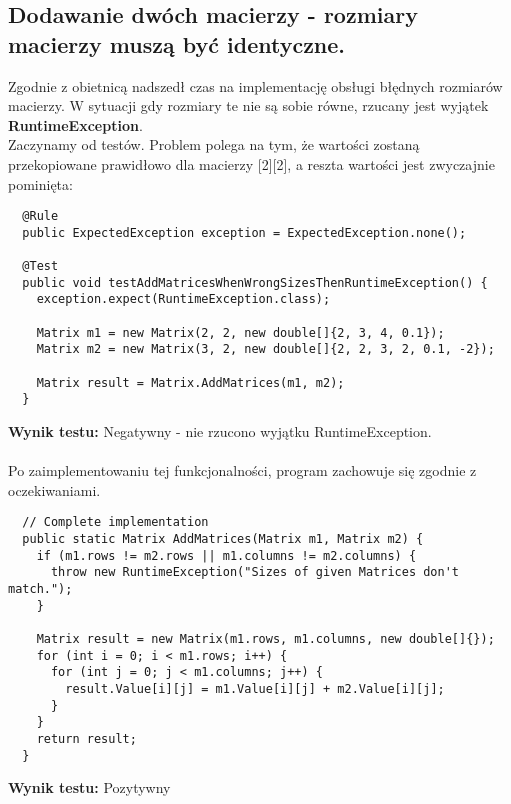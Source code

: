\documentclass[a4paper,12pt,twoside]{article}
\begin{document}
\subsection{Dodawanie dwóch macierzy - rozmiary macierzy muszą być identyczne.}
\bigskip

Zgodnie z obietnicą nadszedł czas na implementację obsługi błędnych rozmiarów macierzy.
W sytuacji gdy rozmiary te nie są sobie równe, rzucany jest wyjątek \textbf{RuntimeException}.\\

\noindent
Zaczynamy od testów. Problem polega na tym, że wartości zostaną przekopiowane prawidłowo dla
macierzy [2][2], a reszta wartości jest zwyczajnie pominięta:\\

\begin{lstlisting}
  @Rule
  public ExpectedException exception = ExpectedException.none();

  @Test
  public void testAddMatricesWhenWrongSizesThenRuntimeException() {
    exception.expect(RuntimeException.class);

    Matrix m1 = new Matrix(2, 2, new double[]{2, 3, 4, 0.1});
    Matrix m2 = new Matrix(3, 2, new double[]{2, 2, 3, 2, 0.1, -2});

    Matrix result = Matrix.AddMatrices(m1, m2);
  }
\end{lstlisting}
\medskip
\noindent
\textbf{Wynik testu: }{\color{red} Negatywny - nie rzucono wyjątku RuntimeException.}\\\\
Po zaimplementowaniu tej funkcjonalności, program
zachowuje się zgodnie z oczekiwaniami.\\

\begin{lstlisting}
  // Complete implementation
  public static Matrix AddMatrices(Matrix m1, Matrix m2) {
    if (m1.rows != m2.rows || m1.columns != m2.columns) {
      throw new RuntimeException("Sizes of given Matrices don't match.");
    }

    Matrix result = new Matrix(m1.rows, m1.columns, new double[]{});
    for (int i = 0; i < m1.rows; i++) {
      for (int j = 0; j < m1.columns; j++) {
        result.Value[i][j] = m1.Value[i][j] + m2.Value[i][j];
      }
    }
    return result;
  }
\end{lstlisting}
\medskip

\noindent
\textbf{Wynik testu: }{\color{green} Pozytywny}
\end{document}
